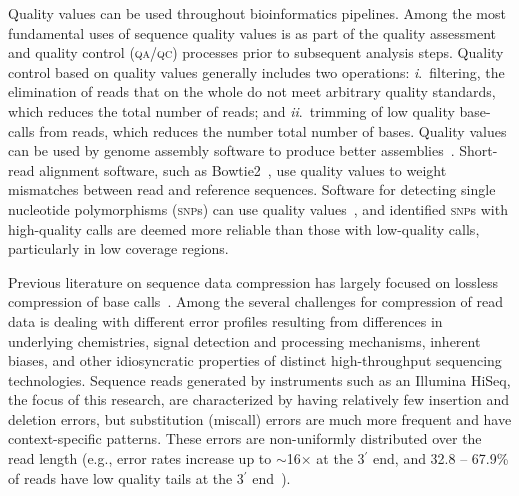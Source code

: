 \documentclass[12pt,\mydriver]{thesis}
\begin{document}
Quality values can be used throughout bioinformatics pipelines. Among
the most fundamental uses of sequence quality values is as part of the
quality assessment and quality control (\textsc{qa/qc}) processes
prior to subsequent analysis steps. Quality control based on quality
values generally includes two operations: \textit{i}.~filtering, the
elimination of reads that on the whole do not meet arbitrary quality
standards, which reduces the total number of reads; and
\textit{ii}.~trimming of low quality base-calls from reads, which
reduces the number total number of bases. Quality values can be used
by genome assembly software to produce better
assemblies~\cite{Bryant:2009uq,Gnerre:2011kx}. Short-read
alignment software, such as Bowtie2~\cite{langmead2012fast}, use
quality values to weight mismatches between read and reference
sequences. Software for detecting single nucleotide polymorphisms
(\textsc{snp}s) can use quality values~\cite{McKenna:2010bh},
and identified \textsc{snp}s with high-quality calls are deemed more
reliable than those with low-quality calls, particularly in low
coverage regions.

Previous literature on sequence data compression has largely focused
on lossless compression of base calls~\cite{asnani2012lossy,Canovas:2014fr,Hach:2012ys,
  janin2013adaptive,Kozanitis:2011kl,Ochoa:2013rt,Tembe:2010ys,
  Wan:2012kq,DBLP:conf/recomb/YuYB14,zhou2014compression}. Among the
several challenges for compression of read data is dealing with
different error profiles resulting from differences in underlying
chemistries, signal detection and processing mechanisms, inherent
biases, and other idiosyncratic properties of distinct high-throughput
sequencing technologies. Sequence reads generated by instruments such
as an Illumina HiSeq, the focus of this research, are characterized by
having relatively few insertion and deletion errors, but substitution
(miscall) errors are much more frequent and have context-specific
patterns. These errors are non-uniformly distributed over the read
length (e.g., error rates increase up to $\sim$16$\times$ at the
3$^{\prime}$ end, and 32.8 -- 67.9\% of reads have low quality tails
at the 3$^{\prime}$ end~\cite{Minoche:2011km}).
\end{document}

